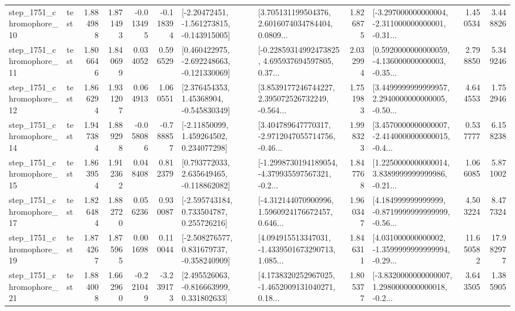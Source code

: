 \begin{tabular}{llrrrrllrlrr}
 step\_1751\_chromophore\_10 &      test &      1.884988 &    1.871493 &     -0.013495 & -0.118394 &   [-2.20472451, -1.561273815, -0.143915005] &  [3.705131199504376, 2.6016074034784404, 0.0809... &       1.826875 &  [-3.297000000000004, -2.311000000000001, -0.31... &            1.450534 &          3.448826 \\
 step\_1751\_chromophore\_11 &      test &      1.806646 &    1.840699 &      0.034052 &  0.596529 &   [0.460422975, -2.692248663, -0.121330069] &  [-0.22859314992473825, 4.695937694597805, 0.37... &       2.032994 &  [0.5920000000000059, -4.136000000000003, -0.35... &            2.798850 &          5.349246 \\
 step\_1751\_chromophore\_12 &      test &      1.866294 &    1.931207 &      0.064913 &  1.060551 &     [2.376454353, 1.45368904, -0.545830349] &  [3.8539177246744227, 2.395072526732249, -0.564... &       1.751983 &  [3.4499999999999957, 2.2940000000000005, -0.50... &            4.644553 &          1.752946 \\
 step\_1751\_chromophore\_14 &      test &      1.947384 &    1.889298 &     -0.058086 & -0.788857 &     [-2.11850099, 1.459264502, 0.234077298] &  [3.404789647770317, -2.9712047055714756, -0.46... &       1.998323 &  [3.4570000000000007, -2.4140000000000015, -0.4... &            0.537777 &          6.158238 \\
 step\_1751\_chromophore\_15 &      test &      1.863954 &    1.912362 &      0.048408 &  0.812379 &    [0.793772033, 2.635649465, -0.118862082] &  [-1.2998730194189054, -4.379935597567321, -0.2... &       1.847768 &  [1.2250000000000014, 3.8389999999999986, -0.21... &            1.066085 &          5.871002 \\
 step\_1751\_chromophore\_17 &      test &      1.826484 &    1.882720 &      0.056236 &  0.930087 &    [-2.595743184, 0.733504787, 0.255726216] &  [-4.312144070900996, 1.5960924176672457, 0.646... &       1.960347 &  [4.184999999999999, -0.8719999999999999, -0.56... &            4.503224 &          8.477324 \\
 step\_1751\_chromophore\_19 &      test &      1.874267 &    1.875965 &      0.001698 &  0.110044 &   [-2.508276577, 0.831679737, -0.358240909] &  [4.094915513347031, -1.4339501673290713, 1.085... &       1.846311 &  [4.031000000000002, -1.3599999999999994, -0.29... &           11.650582 &         17.982977 \\
 step\_1751\_chromophore\_21 &      test &      1.884008 &    1.662960 &     -0.221049 & -3.239173 &    [2.495526063, -0.816663999, 0.331802633] &  [4.1738320252967025, -1.4652009131040271, 0.18... &       1.805377 &  [-3.8320000000000007, 1.2980000000000018, -0.2... &            3.643505 &          1.385905 \\

\end{tabular}
